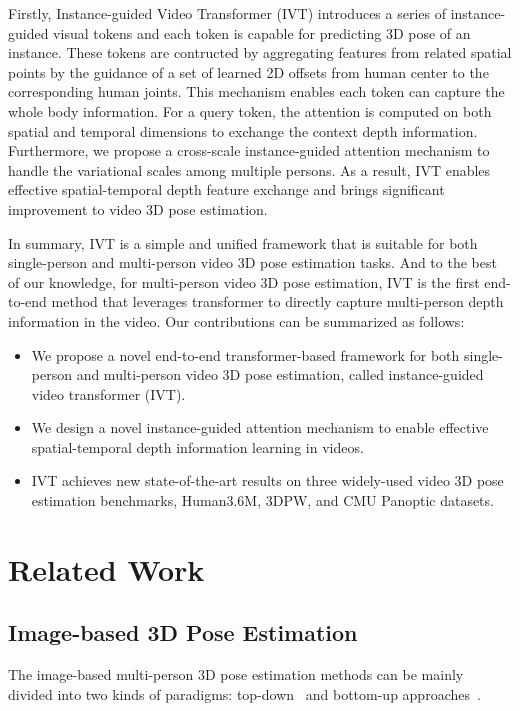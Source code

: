 \documentclass[sigconf]{acmart}
\begin{document}
Firstly, Instance-guided Video Transformer (IVT) introduces a series of instance-guided visual tokens and each token is capable for predicting 3D pose of an instance. These tokens are contructed by aggregating features from related spatial points by the guidance of a set of learned 2D offsets from human center to the corresponding human joints. This mechanism enables each token can capture the whole body information. For a query token, the attention is computed on both spatial and temporal dimensions to exchange the context depth information. Furthermore, we propose a cross-scale instance-guided attention mechanism to handle the variational scales among multiple persons. As a result, IVT enables effective spatial-temporal depth feature exchange and brings significant improvement to video 3D pose estimation.

In summary, IVT is a simple and unified framework that is suitable for both single-person and multi-person video 3D pose estimation tasks. And to the best of our knowledge, for multi-person video 3D pose estimation, IVT is the first end-to-end method that leverages transformer to directly capture multi-person depth information in the video. Our contributions can be summarized as follows:
\begin{itemize}
    \item We propose a novel end-to-end transformer-based framework for both single-person and multi-person video 3D pose estimation, called instance-guided video transformer (IVT).
    \item We design a novel instance-guided attention mechanism to enable effective spatial-temporal depth information learning in videos.
    \item IVT achieves new state-of-the-art results on three widely-used video 3D pose estimation benchmarks, Human3.6M, 3DPW, and CMU Panoptic datasets.
\end{itemize}


\section{Related Work}
\subsection{Image-based 3D Pose Estimation}
The image-based multi-person 3D pose estimation methods can be mainly divided into two kinds of paradigms: top-down~\cite{yang20183d,moon2019camera,zeng2020srnet,lin2021end,sun2021monocular} and bottom-up approaches~\cite{zanfir2018deep,wang2020hmor,zhen2020smap}.
\end{document}
